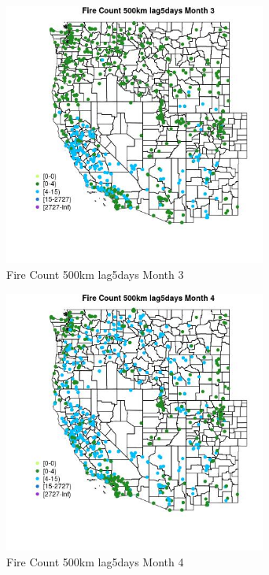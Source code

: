 \begin{figure} 
\centering  
\includegraphics[width=0.77\textwidth]{Code_Outputs/Report_ML_input_PM25_Step4_part_f_de_duplicated_aveswNAs_MapObsMo3Fire_Count_500km_lag5days.jpg} 
\caption{\label{fig:Report_ML_input_PM25_Step4_part_f_de_duplicated_aveswNAsMapObsMo3Fire_Count_500km_lag5days}Fire Count 500km lag5days Month 3} 
\end{figure} 
 

\begin{figure} 
\centering  
\includegraphics[width=0.77\textwidth]{Code_Outputs/Report_ML_input_PM25_Step4_part_f_de_duplicated_aveswNAs_MapObsMo4Fire_Count_500km_lag5days.jpg} 
\caption{\label{fig:Report_ML_input_PM25_Step4_part_f_de_duplicated_aveswNAsMapObsMo4Fire_Count_500km_lag5days}Fire Count 500km lag5days Month 4} 
\end{figure} 
 

